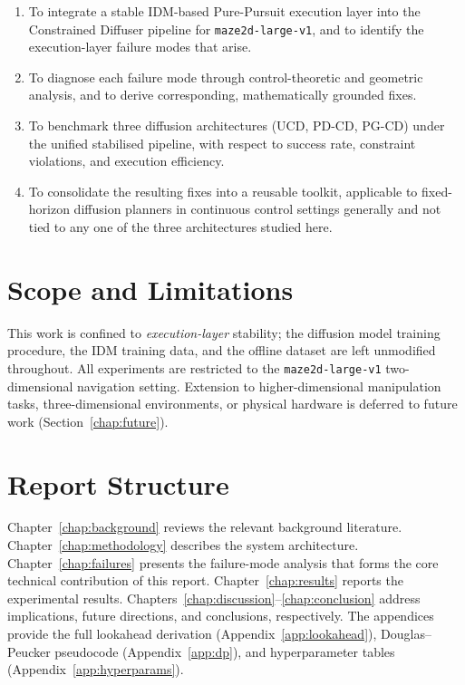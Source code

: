 \documentclass[12pt, a4paper, oneside]{report}
\theoremstyle{definition}
\begin{document}
\begin{enumerate}[label=\textbf{O\arabic*.}, leftmargin=*, itemsep=5pt]
  \item To integrate a stable IDM-based Pure-Pursuit execution
        layer into the Constrained Diffuser pipeline for
        \texttt{maze2d-large-v1}, and to identify the execution-layer
        failure modes that arise.
  \item To diagnose each failure mode through control-theoretic and
        geometric analysis, and to derive corresponding, mathematically
        grounded fixes.
  \item To benchmark three diffusion architectures (UCD, PD-CD,
        PG-CD) under the unified stabilised pipeline, with respect
        to success rate, constraint violations, and execution
        efficiency.
  \item To consolidate the resulting fixes into a reusable toolkit,
        applicable to fixed-horizon diffusion planners in continuous
        control settings generally and not tied to any one of the
        three architectures studied here.
\end{enumerate}

\section{Scope and Limitations}
\label{sec:scope}

This work is confined to \emph{execution-layer} stability; the
diffusion model training procedure, the IDM training data, and the
offline dataset are left unmodified throughout. All experiments are
restricted to the \texttt{maze2d-large-v1} two-dimensional
navigation setting. Extension to higher-dimensional manipulation
tasks, three-dimensional environments, or physical hardware is
deferred to future work (Section~\ref{chap:future}).

\section{Report Structure}
\label{sec:structure}

Chapter~\ref{chap:background} reviews the relevant background
literature. Chapter~\ref{chap:methodology} describes the system
architecture. Chapter~\ref{chap:failures} presents the failure-mode
analysis that forms the core technical contribution of this report.
Chapter~\ref{chap:results} reports the experimental results.
Chapters~\ref{chap:discussion}--\ref{chap:conclusion} address
implications, future directions, and conclusions, respectively. The
appendices provide the full lookahead derivation
(Appendix~\ref{app:lookahead}), Douglas--Peucker pseudocode
(Appendix~\ref{app:dp}), and hyperparameter tables
(Appendix~\ref{app:hyperparams}).
\end{document}
